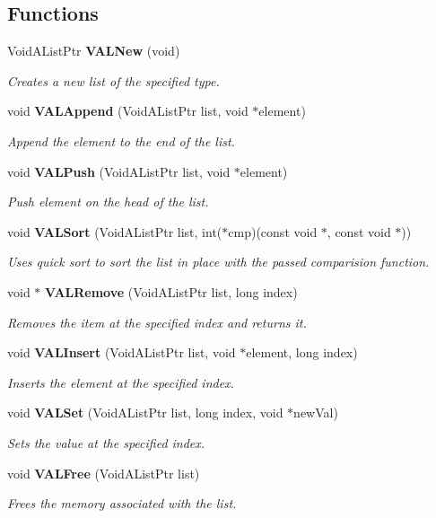 \subsection*{Functions}
\begin{CompactItemize}
\item 
Void\-AList\-Ptr {\bf VALNew} (void)
\begin{CompactList}\small\item\em Creates a new list of the specified type. \item\end{CompactList}\item 
void {\bf VALAppend} (Void\-AList\-Ptr list, void $\ast$element)
\begin{CompactList}\small\item\em Append the element to the end of the list. \item\end{CompactList}\item 
void {\bf VALPush} (Void\-AList\-Ptr list, void $\ast$element)
\begin{CompactList}\small\item\em Push element on the head of the list. \item\end{CompactList}\item 
void {\bf VALSort} (Void\-AList\-Ptr list, int($\ast$cmp)(const void $\ast$, const void $\ast$))
\begin{CompactList}\small\item\em Uses quick sort to sort the list in place with the passed comparision function. \item\end{CompactList}\item 
void $\ast$ {\bf VALRemove} (Void\-AList\-Ptr list, long index)
\begin{CompactList}\small\item\em Removes the item at the specified index and returns it. \item\end{CompactList}\item 
void {\bf VALInsert} (Void\-AList\-Ptr list, void $\ast$element, long index)
\begin{CompactList}\small\item\em Inserts the element at the specified index. \item\end{CompactList}\item 
void {\bf VALSet} (Void\-AList\-Ptr list, long index, void $\ast$new\-Val)
\begin{CompactList}\small\item\em Sets the value at the specified index. \item\end{CompactList}\item 
void {\bf VALFree} (Void\-AList\-Ptr list)
\begin{CompactList}\small\item\em Frees the memory associated with the list. \item\end{CompactList}\end{CompactItemize}


